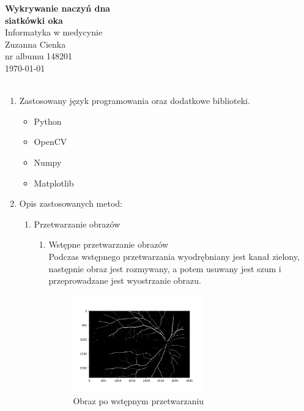 \documentclass{article}
\begin{document}
\begin{center}\vspace{-1cm}
    \textbf{ \Huge Wykrywanie naczyń dna \\siatkówki oka}\\
    \LARGE Informatyka w medycynie\\
    \Large Zuzanna Cienka  \\
    \large nr albumu 148201\\
    \large \today \\~\\
\end{center}

\begin{enumerate}

    \item Zastosowany język programowania oraz dodatkowe biblioteki.
          \begin{itemize}
              \item Python
              \item OpenCV
              \item Numpy
              \item Matplotlib
          \end{itemize}
    \item Opis zastosowanych metod:
          \begin{enumerate}
              \item Przetwarzanie obrazów
              \begin{enumerate}
                \item Wstępne przetwarzanie obrazów\\
                Podczas wstępnego przetwarzania wyodrębniany jest kanał zielony, 
                następnie obraz jest rozmywany, a potem usuwany jest szum i przeprowadzane jest 
                wyostrzanie obrazu.
                \begin{figure}[h]
                    \centering
                    \includegraphics[width=0.6\textwidth]{../res/sample-preprocessed-image.png}
                    \caption{Obraz po wstępnym przetwarzaniu}
                  \end{figure}

              \end{enumerate}

          \end{enumerate}


\end{enumerate}
\end{document}
